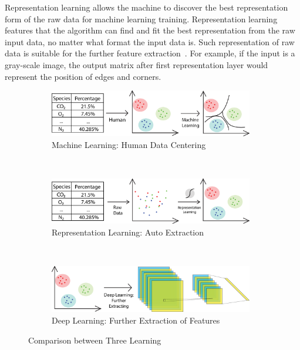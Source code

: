 \begin{spacing}{1.5}
Representation learning allows the machine to discover the best representation form of the raw data for machine learning training. Representation learning features that the algorithm can find and fit the best representation from the raw input data, no matter what format the input data is. Such representation of raw data is suitable for the further feature extraction~\cite{bengio2013representation}. For example, if the input is a gray-scale image, the output matrix after first representation layer would represent the position of edges and corners.

\begin{figure}[th]
    \centering
    \begin{subfigure}[b]{0.99\textwidth}
        \centering
        \includegraphics[width=0.98\textwidth, fbox]{Chapter2/Machine-Learing.eps}
        \caption{Machine Learning: Human Data Centering}
        \label{fig:mldiagram} 
    \end{subfigure}%
    \\
    \begin{subfigure}[b]{0.99\textwidth}
        \centering
        \includegraphics[width=0.98\textwidth, fbox]{Chapter2/Represent-Learing.eps}
        \caption{Representation Learning: Auto Extraction}
        \label{fig:representdiagram} 
    \end{subfigure}
    \\
    \begin{subfigure}[b]{0.99\textwidth}
        \centering
        \includegraphics[width=0.98\textwidth, fbox]{Chapter2/Deep-Learing.eps}
        \caption{Deep Learning: Further Extraction of Features}
        \label{fig:dldiagram} 
    \end{subfigure}%
    \caption{Comparison between Three Learning}
\end{figure}


\end{spacing}
